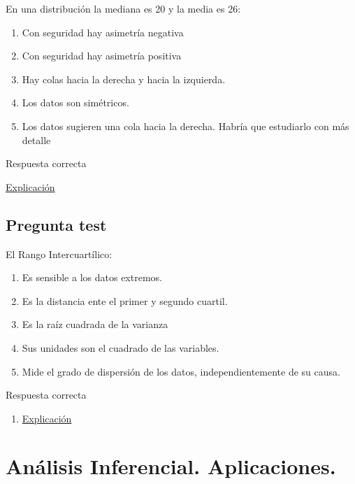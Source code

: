 \documentclass[
]{book}
\providecommand{\tightlist}{%
  \setlength{\itemsep}{0pt}\setlength{\parskip}{0pt}}
\begin{document}
En una distribución la mediana es 20 y la media es 26:

\begin{enumerate}
\def\labelenumi{\alph{enumi})}
\tightlist
\item
  Con seguridad hay asimetría negativa
\item
  Con seguridad hay asimetría positiva
\item
  Hay colas hacia la derecha y hacia la izquierda.
\item
  Los datos son simétricos.
\item
  Los datos sugieren una cola hacia la derecha. Habría que estudiarlo con más detalle
\end{enumerate}

Respuesta correcta

\href{https://1fjmanzano.github.io/bioestadistica/medidas-de-forma.html}{Explicación}

\hypertarget{pregunta-test-81}{%
\section{Pregunta test}\label{pregunta-test-81}}

El Rango Intercuartílico:

\begin{enumerate}
\def\labelenumi{\alph{enumi})}
\tightlist
\item
  Es sensible a los datos extremos.
\item
  Es la distancia ente el primer y segundo cuartil.
\item
  Es la raíz cuadrada de la varianza
\item
  Sus unidades son el cuadrado de las variables.
\item
  Mide el grado de dispersión de los datos, independientemente de su causa.
\end{enumerate}

Respuesta correcta

\begin{enumerate}
\def\labelenumi{\alph{enumi})}
\setcounter{enumi}{4}
\tightlist
\item
  \href{https://1fjmanzano.github.io/bioestadistica/medidas-de-posicio\%CC\%81n-dispersio\%CC\%81n-y-forma.html\#medidas-de-dispersio\%CC\%81n}{Explicación}
\end{enumerate}

\hypertarget{anuxe1lisis-inferencial.-aplicaciones.}{%
\chapter{Análisis Inferencial. Aplicaciones.}\label{anuxe1lisis-inferencial.-aplicaciones.}}
\end{document}
